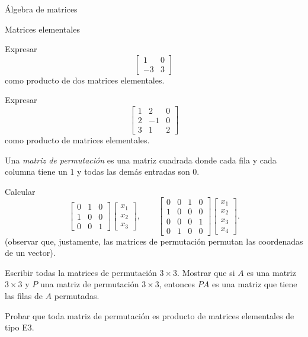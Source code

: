 \begin{chapter}{\'Algebra de matrices}
\begin{section}{Matrices elementales}
\begin{enumex}
                \item Expresar 
                $$
                \begin{bmatrix}
                    1&0 \\ -3&3
                \end{bmatrix}
                $$
                como producto de dos matrices elementales. 

                \item Expresar 
                $$
                \begin{bmatrix}
                    1&2&0 \\ 2&-1&0 \\3&1&2
                \end{bmatrix}
                $$
                como producto de matrices elementales.

                \item\label{matriz-de-permutacion} Una \textit{matriz de permutación} es una matriz cuadrada donde cada fila y  cada columna tiene  un $1$ y todas las demás entradas son $0$. 
                \begin{enumex}
                    \item Calcular   
                    $$
                    \begin{bmatrix} 0&1&0 \\ 1&0&0\\ 0&0&1 \end{bmatrix} 
                    \begin{bmatrix} x_1 \\ x_2\\ x_3 \end{bmatrix}, \qquad 
                    \begin{bmatrix} 0&0&1&0 \\ 1&0&0&0\\ 0&0&0&1 \\0&1&0&0 \end{bmatrix} 
                    \begin{bmatrix} x_1 \\ x_2\\ x_3 \\x_4 \end{bmatrix}.
                    $$
                    (observar que,  justamente, las matrices de permutación permutan las coordenadas de un vector).
                    \item Escribir todas la matrices de permutación $3\times 3$. Mostrar que si $A$ es una matriz $3 \times 3$ y $P$ una matriz de permutación $3 \times 3$,  entonces $PA$ es una matriz que tiene las filas de $A$ permutadas.  
                    \item Probar que toda matriz de permutación es producto de matrices elementales de tipo E3. 
                \end{enumex}
                  

\end{enumex}
\end{section}
\end{chapter}
